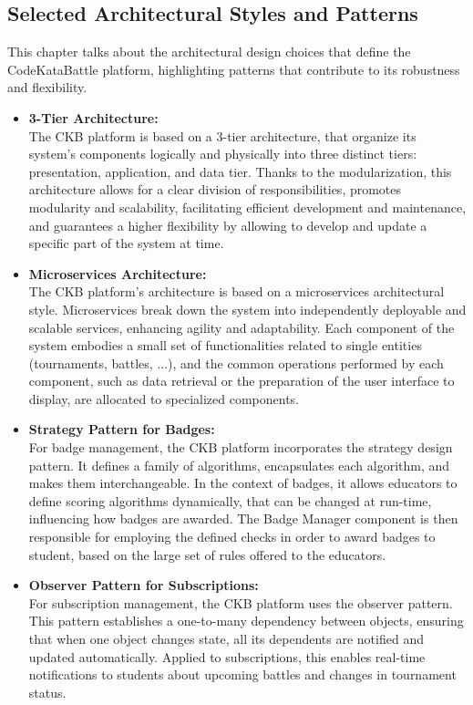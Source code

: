  \subsection{Selected Architectural Styles and Patterns}
 This chapter talks about the architectural design choices that define the CodeKataBattle platform, highlighting patterns that contribute to its robustness and flexibility.
 
\begin{itemize}
    \item \textbf{3-Tier Architecture:} \\
    The CKB platform is based on a 3-tier architecture, that organize its system’s components logically and physically into three distinct tiers: presentation, application, and data tier. Thanks to the modularization, this architecture allows for a clear division of responsibilities, promotes modularity and scalability, facilitating efficient development and maintenance, and guarantees a higher flexibility by allowing to develop and update a specific part of the system at time. 

    \item \textbf{Microservices Architecture:} \\
    The CKB platform's architecture is based on a microservices architectural style. Microservices break down the system into independently deployable and scalable services, enhancing agility and adaptability. Each component of the system embodies a small set of functionalities related to single entities (tournaments, battles, ...), and the common operations performed by each component, such as data retrieval or the preparation of the user interface to display, are allocated to specialized components.

    \item \textbf{Strategy Pattern for Badges:} \\
    For badge management, the CKB platform incorporates the strategy design pattern. It defines a family of algorithms, encapsulates each algorithm, and makes them interchangeable. In the context of badges, it allows educators to define scoring algorithms dynamically, that can be changed at run-time, influencing how badges are awarded. The Badge Manager component is then responsible for employing the defined checks in order to award badges to student, based on the large set of rules offered to the educators.

    \item \textbf{Observer Pattern for Subscriptions:} \\
    For subscription management, the CKB platform uses the observer pattern. This pattern establishes a one-to-many dependency between objects, ensuring that when one object changes state, all its dependents are notified and updated automatically. Applied to subscriptions, this enables real-time notifications to students about upcoming battles and changes in tournament status.


\end{itemize}

